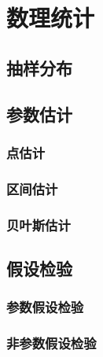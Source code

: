 \section{数理统计}

\subsection{抽样分布}

\subsection{参数估计}

\subsubsection{点估计}

\subsubsection{区间估计}

\subsubsection{贝叶斯估计}

\subsection{假设检验}

\subsubsection{参数假设检验}

\subsubsection{非参数假设检验}
